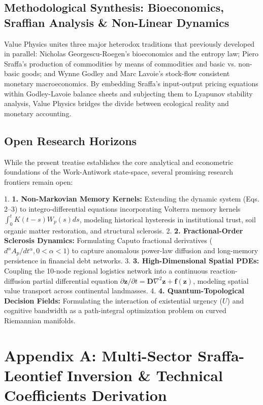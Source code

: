 \documentclass[preprint,12pt,authoryear]{elsarticle}
\theoremstyle{definition}
\begin{document}
\subsection{Methodological Synthesis: Bioeconomics, Sraffian Analysis \& Non-Linear Dynamics}

Value Physics unites three major heterodox traditions that previously developed in parallel: Nicholas Georgescu-Roegen's bioeconomics and the entropy law; Piero Sraffa's production of commodities by means of commodities and basic vs. non-basic goods; and Wynne Godley and Marc Lavoie's stock-flow consistent monetary macroeconomics. By embedding Sraffa's input-output pricing equations within Godley-Lavoie balance sheets and subjecting them to Lyapunov stability analysis, Value Physics bridges the divide between ecological reality and monetary accounting.

\subsection{Open Research Horizons}

While the present treatise establishes the core analytical and econometric foundations of the Work-Antiwork state-space, several promising research frontiers remain open:

1.  \textbf{1. Non-Markovian Memory Kernels:} Extending the dynamic system (Eqs. 2--3) to integro-differential equations incorporating Volterra memory kernels $\int_0^t K(t - s) W_p(s) ds$, modeling historical hysteresis in institutional trust, soil organic matter restoration, and structural sclerosis.
2.  \textbf{2. Fractional-Order Sclerosis Dynamics:} Formulating Caputo fractional derivatives ($d^\alpha A_p / dt^\alpha, 0 < \alpha < 1$) to capture anomalous power-law diffusion and long-memory persistence in financial debt networks.
3.  \textbf{3. High-Dimensional Spatial PDEs:} Coupling the 10-node regional logistics network into a continuous reaction-diffusion partial differential equation $\partial \mathbf{z} / \partial t = \mathbf{D} \nabla^2 \mathbf{z} + \mathbf{f}(\mathbf{z})$, modeling spatial value transport across continental landmasses.
4.  \textbf{4. Quantum-Topological Decision Fields:} Formulating the interaction of existential urgency ($U$) and cognitive bandwidth as a path-integral optimization problem on curved Riemannian manifolds.

\section*{Appendix A: Multi-Sector Sraffa-Leontief Inversion \& Technical Coefficients Derivation}
\end{document}
